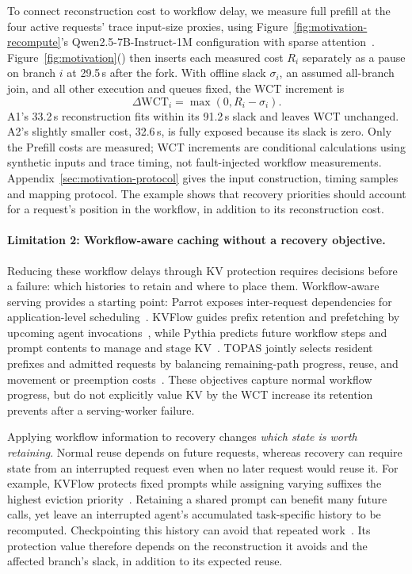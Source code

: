 To connect reconstruction cost to workflow delay, we measure full
prefill at the four active requests' trace input-size proxies, using
Figure~\ref{fig:motivation-recompute}'s Qwen2.5-7B-Instruct-1M
configuration with sparse attention~\cite{qwen2025qwen25oneM,jiang2024minference}.
Figure~\ref{fig:motivation}()
then inserts each measured cost $R_i$ separately as a pause on branch
$i$ at 29.5\,s after the fork. With offline slack $\sigma_i$, an assumed
all-branch join, and all other execution and queues fixed, the WCT
increment is
\[
  \Delta\mathrm{WCT}_i=\max(0,R_i-\sigma_i).
\]
A1's 33.2\,s reconstruction fits within its 91.2\,s slack and leaves WCT
unchanged. A2's slightly smaller cost, 32.6\,s, is fully exposed because
its slack is zero.
Only the Prefill costs are measured; WCT increments are conditional
calculations using synthetic inputs and trace timing, not fault-injected
workflow measurements. Appendix~\ref{sec:motivation-protocol} gives the
input construction, timing samples and mapping protocol.
The example shows that recovery priorities should account for a request's
position in the workflow, in addition to its reconstruction cost.

\paragraph{Limitation 2: Workflow-aware caching without a recovery objective.}
Reducing these workflow delays through KV protection requires decisions
before a failure: which histories to retain and where to place them.
Workflow-aware serving provides a starting point: Parrot exposes
inter-request dependencies for application-level
scheduling~\cite{lin2024parrot}. KVFlow guides prefix retention and
prefetching by upcoming agent invocations~\cite{pan2025kvflow}, while Pythia
predicts future workflow steps and prompt contents to manage and stage
KV~\cite{yu2026pythia}. TOPAS jointly selects resident prefixes and admitted
requests by balancing remaining-path progress, reuse, and movement or
preemption costs~\cite{ni2026topas}. These objectives capture normal workflow
progress, but do not explicitly value KV by the WCT increase its retention
prevents after a serving-worker failure.

Applying workflow information to recovery changes \emph{which state is
worth retaining}.
Normal reuse depends on future requests, whereas recovery can require
state from an interrupted request even when no later request would reuse
it. For example, KVFlow protects fixed prompts while assigning varying
suffixes the highest eviction priority~\cite{pan2025kvflow}.
Retaining a shared prompt can benefit many future calls, yet leave an
interrupted agent's accumulated task-specific history to be recomputed.
Checkpointing this history can avoid that repeated
work~\cite{strati2024dejavu}. Its protection value therefore depends on
the reconstruction it avoids and the affected branch's slack, in
addition to its expected reuse.


